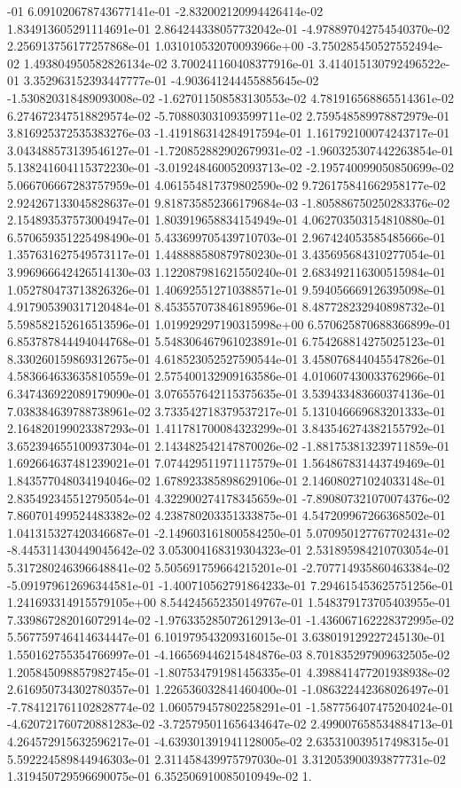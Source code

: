 -01	6.091020678743677141e-01	-2.832002120994426414e-02	1.834913605291114691e-01	2.864244338057732042e-01	-4.978897042754540370e-02	2.256913756177257868e-01	1.031010532070093966e+00	-3.750285450527552494e-02	1.493804950582826134e-02	3.700241160408377916e-01	3.414015130792496522e-01	3.352963152393447777e-01	-4.903641244455885645e-02	-1.530820318489093008e-02	-1.627011508583130553e-02	4.781916568865514361e-02	6.274672347518829574e-02	-5.708803031093599711e-02	2.759548589978872979e-01	3.816925372535383276e-03	-1.419186314284917594e-01	1.161792100074243717e-01	3.043488573139546127e-01	-1.720852882902679931e-02	-1.960325307442263854e-01	5.138241604115372230e-01	-3.019248460052093713e-02	-2.195740099050850699e-02	5.066706667283757959e-01	4.061554817379802590e-02	9.726175841662958177e-02	2.924267133045828637e-01	9.818735852366179684e-03	-1.805886750250283376e-02	2.154893537573004947e-01	1.803919658834154949e-01	4.062703503154810880e-01	6.570659351225498490e-01	5.433699705439710703e-01	2.967424053585485666e-01	1.357631627549573117e-01	1.448888580879780230e-01	3.435695684310277054e-01	3.996966642426514130e-03	1.122087981621550240e-01	2.683492116300515984e-01	1.052780473713826326e-01	1.406925512710388571e-01	9.594056669126395098e-01	4.917905390317120484e-01	8.453557073846189596e-01	8.487728232940898732e-01	5.598582152616513596e-01	1.019929297190315998e+00	6.570625870688366899e-01	6.853787844494044768e-01	5.548306467961023891e-01	6.754268814275025123e-01	8.330260159869312675e-01	4.618523052527590544e-01	3.458076844045547826e-01	4.583664633635810559e-01	2.575400132909163586e-01	4.010607430033762966e-01	6.347436922089179090e-01	3.076557642115375635e-01	3.539433483660374136e-01	7.038384639788738961e-02	3.733542718379537217e-01	5.131046669683201333e-01	2.164820199023387293e-01	1.411781700084323299e-01	3.843546274382155792e-01	3.652394655100937304e-01	2.143482542147870026e-02	-1.881753813239711859e-01	1.692664637481239021e-01	7.074429511971117579e-01	1.564867831443749469e-01	1.843577048034194046e-02	1.678923385898629106e-01	2.146080271024033148e-01	2.835492345512795054e-01	4.322900274178345659e-01	-7.890807321070074376e-02	7.860701499524483382e-02	4.238780203351333875e-01	4.547209967266368502e-01	1.041315327420346687e-01	-2.149603161800584250e-01	5.070950127767702431e-02	-8.445311430449045642e-02	3.053004168319304323e-01	2.531895984210703054e-01	5.317280246396648841e-02	5.505691759664215201e-01	-2.707714935860463384e-02	-5.091979612696344581e-01	-1.400710562791864233e-01	7.294615453625751256e-01	1.241693314915579105e+00	8.544245652350149767e-01	1.548379173705403955e-01	7.339867282016072914e-02	-1.976335285072612913e-01	-1.436067162228372995e-02	5.567759746414634447e-01	6.101979543209316015e-01	3.638019129227245130e-01	1.550162755354766997e-01	-4.166569446215484876e-03	8.701835297909632505e-02	1.205845098857982745e-01	-1.807534791981456335e-01	4.398841477201938938e-02	2.616950734302780357e-01	1.226536032841460400e-01	-1.086322442368026497e-01	-7.784121761102828774e-02	1.060579457802258291e-01	-1.587756407475204024e-01	-4.620721760720881283e-02	-3.725795011656434647e-02	2.499007658534884713e-01	4.264572915632596217e-01	-4.639301391941128005e-02	2.635310039517498315e-01	5.592224589844946303e-01	2.311458439975797030e-01	3.312053900393877731e-02	1.319450729596690075e-01	6.352506910085010949e-02	1.